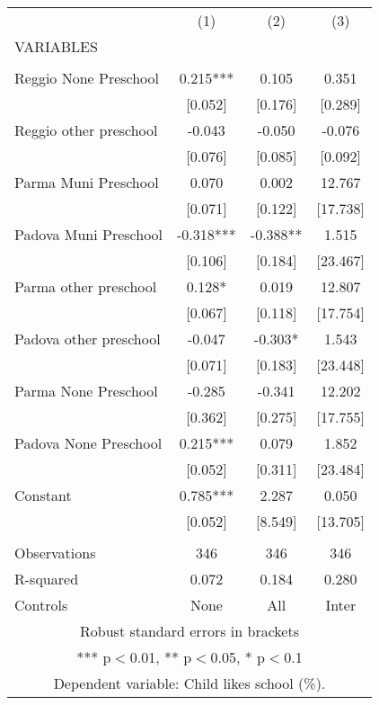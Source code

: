 \begin{tabular}{lccc} \hline
 & (1) & (2) & (3) \\
VARIABLES &  &  &  \\ \hline
 &  &  &  \\
Reggio None Preschool & 0.215*** & 0.105 & 0.351 \\
 & [0.052] & [0.176] & [0.289] \\
Reggio other preschool & -0.043 & -0.050 & -0.076 \\
 & [0.076] & [0.085] & [0.092] \\
Parma Muni Preschool & 0.070 & 0.002 & 12.767 \\
 & [0.071] & [0.122] & [17.738] \\
Padova Muni Preschool & -0.318*** & -0.388** & 1.515 \\
 & [0.106] & [0.184] & [23.467] \\
Parma other preschool & 0.128* & 0.019 & 12.807 \\
 & [0.067] & [0.118] & [17.754] \\
Padova other preschool & -0.047 & -0.303* & 1.543 \\
 & [0.071] & [0.183] & [23.448] \\
Parma None Preschool & -0.285 & -0.341 & 12.202 \\
 & [0.362] & [0.275] & [17.755] \\
Padova None Preschool & 0.215*** & 0.079 & 1.852 \\
 & [0.052] & [0.311] & [23.484] \\
Constant & 0.785*** & 2.287 & 0.050 \\
 & [0.052] & [8.549] & [13.705] \\
 &  &  &  \\
Observations & 346 & 346 & 346 \\
R-squared & 0.072 & 0.184 & 0.280 \\
 Controls & None & All & Inter \\ \hline
\multicolumn{4}{c}{ Robust standard errors in brackets} \\
\multicolumn{4}{c}{ *** p$<$0.01, ** p$<$0.05, * p$<$0.1} \\
\multicolumn{4}{c}{ Dependent variable: Child likes school (\%).} \\
\end{tabular}
